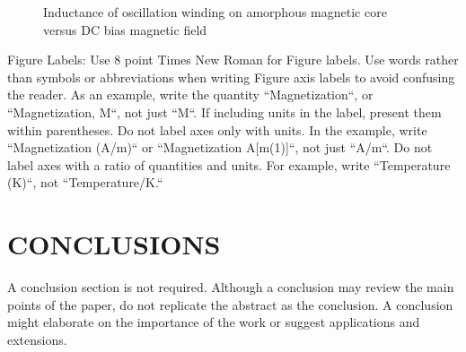 \documentclass[letterpaper, 10 pt, conference]{ieeeconf}
\begin{document}
   \begin{figure}[thpb]
      \centering
      \caption{Inductance of oscillation winding on amorphous
       magnetic core versus DC bias magnetic field}
      \label{figurelabel}
   \end{figure}
   

Figure Labels: Use 8 point Times New Roman for Figure labels. Use words rather than symbols or abbreviations when writing Figure axis labels to avoid confusing the reader. As an example, write the quantity ``Magnetization``, or ``Magnetization, M``, not just ``M``. If including units in the label, present them within parentheses. Do not label axes only with units. In the example, write ``Magnetization (A/m)`` or ``Magnetization {A[m(1)]}``, not just ``A/m``. Do not label axes with a ratio of quantities and units. For example, write ``Temperature (K)``, not ``Temperature/K.``

\section{CONCLUSIONS}

A conclusion section is not required. Although a conclusion may review the main points of the paper, do not replicate the abstract as the conclusion. A conclusion might elaborate on the importance of the work or suggest applications and extensions. 

\addtolength{\textheight}{-12cm}   %




\end{document}

